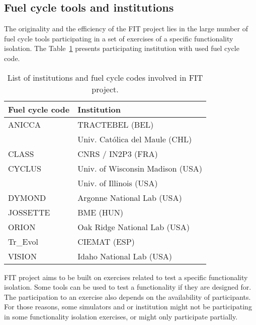 \subsection{Fuel cycle tools and institutions}

The originality and the efficiency of the FIT project lies in the large number
of fuel cycle tools participating in a set of exercises of a specific
functionality isolation. The Table~\ref{Tab:Code} presents participating
institution with used fuel cycle code.

\begin{table}[h]
\centering
\begin{tabular}{ |l|l| }
  \hline
  Fuel cycle code & Institution \\
  \hline
  ANICCA\cite{} & TRACTEBEL (BEL) \\
   & Univ. Católica del Maule (CHL) \\
  \hline
  CLASS\cite{Thiolliere_2018} & CNRS / IN2P3 (FRA) \\
  \hline
  CYCLUS\cite{} & Univ. of Wisconsin Madison (USA) \\
  & Univ. of Illinois (USA) \\
  \hline
  DYMOND\cite{} & Argonne National Lab (USA) \\
  \hline
  JOSSETTE\cite{} & BME (HUN) \\
  \hline
  ORION\cite{} & Oak Ridge National Lab (USA) \\
  \hline
  Tr\_Evol\cite{} & CIEMAT (ESP) \\
  \hline
  VISION\cite{jacobson2009vision} & Idaho National Lab (USA) \\
  \hline
\end{tabular}
\label{Tab:Code}
\caption{List of institutions and fuel cycle codes involved in FIT project.}
\end{table}

FIT project aims to be built on exercises related to test a specific
functionality isolation. Some tools can be used to test a functionality if they are
designed for. The participation to an exercise also depends on the availability
of participants. For those reasons, some simulators and or institution might not
be participating in some functionality isolation exercises, or might only
participate partially.
